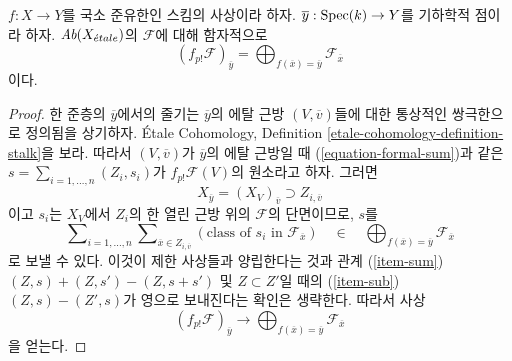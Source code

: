 \begin{lemma}
\label{lemma-finite-support-stalk}
$f : X \to Y$를 국소 준유한인 스킴의 사상이라 하자.
$\overline{y} : \mathop{\mathrm{Spec}}(k) \to Y$를 기하학적 점이라 하자.
$\textit{Ab}(X_{\acute{e}tale})$의 $\mathcal{F}$에 대해 함자적으로
$$
(f_{p!}\mathcal{F})_{\overline{y}} =
\bigoplus\nolimits_{f(\overline{x}) = \overline{y}} \mathcal{F}_{\overline{x}}
$$
이다.
\end{lemma}

\begin{proof}
한 준층의 $\overline{y}$에서의 줄기는 $\overline{y}$의 에탈 근방
$(V, \overline{v})$들에 대한 통상적인 쌍극한으로 정의됨을 상기하자.
\'Etale Cohomology, Definition
\ref{etale-cohomology-definition-stalk}을 보라. 따라서
$(V, \overline{v})$가 $\overline{y}$의 에탈 근방일 때
(\ref{equation-formal-sum})과 같은
$s = \sum_{i = 1, \ldots, n} (Z_i, s_i)$가
$f_{p!}\mathcal{F}(V)$의 원소라고 하자. 그러면
$$
X_{\overline{y}} = (X_V)_{\overline{v}} \supset Z_{i, \overline{v}}
$$
이고 $s_i$는 $X_V$에서 $Z_i$의 한 열린 근방 위의 $\mathcal{F}$의
단면이므로, $s$를
$$
\sum\nolimits_{i = 1, \ldots, n} 
\sum\nolimits_{\overline{x} \in Z_{i, \overline{v}}}
\left(\text{class of }s_i\text{ in }\mathcal{F}_{\overline{x}}\right)
\quad\in\quad
\bigoplus\nolimits_{f(\overline{x}) = \overline{y}} \mathcal{F}_{\overline{x}}
$$
로 보낼 수 있다. 이것이 제한 사상들과 양립한다는 것과 관계
(\ref{item-sum}) $(Z, s) + (Z, s') - (Z, s + s')$ 및
$Z \subset Z'$일 때의 (\ref{item-sub}) $(Z, s) - (Z', s)$가
영으로 보내진다는 확인은 생략한다. 따라서 사상
$$
(f_{p!}\mathcal{F})_{\overline{y}}
\longrightarrow
\bigoplus\nolimits_{f(\overline{x}) = \overline{y}} \mathcal{F}_{\overline{x}}
$$
을 얻는다.


\end{proof}

